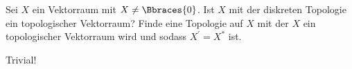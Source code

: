 \begin{exercise}

Sei $X$ ein Vektorraum mit $X \neq \Bbraces{0}$. Ist $X$ mit der diskreten Topologie ein topologischer Vektorraum?
Finde eine Topologie auf $X$ mit der $X$ ein topologischer Vektorraum wird und sodass $X^\prime = X^\ast$ ist.

\end{exercise}

\begin{solution}

Trivial!

\end{solution}
